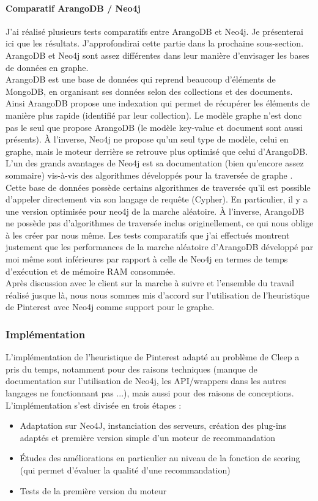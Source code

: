 \documentclass{article} %
\begin{document}
\paragraph{Comparatif ArangoDB / Neo4j\\}
J'ai réalisé plusieurs tests comparatifs entre ArangoDB et Neo4j. Je présenterai ici que les résultats. J'approfondirai cette partie dans la prochaine sous-section. ArangoDB et Neo4j sont assez différentes dans leur manière d'envisager les bases de données en graphe.\\
ArangoDB est une base de données qui reprend beaucoup d'éléments de MongoDB, en organisant ses données selon des collections et des documents. Ainsi ArangoDB propose une indexation qui permet de récupérer les éléments de manière plus rapide (identifié par leur collection). Le modèle graphe n'est donc pas le seul que propose ArangoDB (le modèle key-value et document sont aussi présents). À l'inverse, Neo4j ne propose qu'un seul type de modèle, celui en graphe, mais le moteur derrière se retrouve plus optimisé que celui d'ArangoDB.\\

L'un des grands avantages de Neo4j est sa documentation (bien qu'encore assez sommaire) vis-à-vis des algorithmes développés pour la traversée de graphe \cite{neo4j}. Cette base de données possède certains algorithmes de traversée qu'il est possible d'appeler directement via son langage de requête (Cypher). En particulier, il y a une version optimisée pour neo4j de la marche aléatoire. À l'inverse, ArangoDB ne possède pas d'algorithmes de traversée inclus originellement, ce qui nous oblige à les créer par nous même. Les tests comparatifs que j'ai effectués montrent justement que les performances de la marche aléatoire d'ArangoDB développé par moi même sont inférieures par rapport à celle de Neo4j en termes de temps d'exécution et de mémoire RAM consommée.\\
Après discussion avec le client sur la marche à suivre et l'ensemble du travail réalisé jusque là, nous nous sommes mis d'accord sur l'utilisation de l'heuristique de Pinterest avec Neo4j comme support pour le graphe.

\subsubsection{Implémentation}
L'implémentation de l'heuristique de Pinterest adapté au problème de Cleep a pris du temps, notamment pour des raisons techniques (manque de documentation sur l'utilisation de Neo4j, les API/wrappers dans les autres langages ne fonctionnant pas ...), mais aussi pour des raisons de conceptions. L'implémentation s'est divisée en trois étapes :
\begin{itemize}
 \item Adaptation sur Neo4J, instanciation des serveurs, création des plug-ins adaptés et première version simple d'un moteur de recommandation
 \item Études des améliorations en particulier au niveau de la fonction de scoring (qui permet d'évaluer la qualité d'une recommandation)
 \item Tests de la première version du moteur
\end{itemize}
\end{document}
